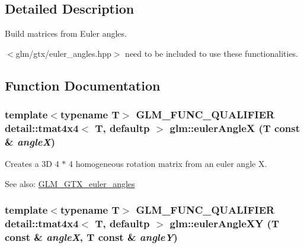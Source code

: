 \subsection{Detailed Description}
Build matrices from Euler angles. 

$<$glm/gtx/euler\_\-angles.hpp$>$ need to be included to use these functionalities. 

\subsection{Function Documentation}
\hypertarget{group__gtx__euler__angles_g5fb8269b6795f95dec7ca7bbe61805f6}{
\subsubsection[eulerAngleX]{\setlength{\rightskip}{0pt plus 5cm}template$<$typename T$>$ GLM\_\-FUNC\_\-QUALIFIER detail::tmat4x4$<$ T, defaultp $>$ glm::eulerAngleX (T const \& {\em angleX})}}
\label{group__gtx__euler__angles_g5fb8269b6795f95dec7ca7bbe61805f6}


Creates a 3D 4 $\ast$ 4 homogeneous rotation matrix from an euler angle X. \begin{Desc}
\item[See also:]\hyperlink{group__gtx__euler__angles}{GLM\_\-GTX\_\-euler\_\-angles} \end{Desc}
\hypertarget{group__gtx__euler__angles_g6a2dc9bf80aecdffb3e5ab3bcede6647}{
\subsubsection[eulerAngleXY]{\setlength{\rightskip}{0pt plus 5cm}template$<$typename T$>$ GLM\_\-FUNC\_\-QUALIFIER detail::tmat4x4$<$ T, defaultp $>$ glm::eulerAngleXY (T const \& {\em angleX}, \/  T const \& {\em angleY})}}
\label{group__gtx__euler__angles_g6a2dc9bf80aecdffb3e5ab3bcede6647}



